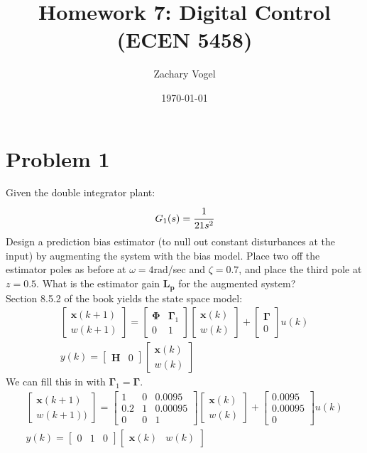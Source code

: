\documentclass{article}
\title{Homework 7: Digital Control (ECEN 5458)}
\author{Zachary Vogel}
\date{\today}
\begin{document}
\maketitle

\section*{Problem 1}
Given the double integrator plant:
\[G_1(s)=\cfrac{1}{21s^2}\]
Design a prediction bias estimator (to null out constant disturbances at the input) by augmenting the system with the bias model. Place two off the estimator poles as before at $\omega=4$rad/sec and $\zeta=0.7$, and place the third pole at $z=0.5$. What is the estimator gain $\pmb{L_p}$ for the augmented system?\\
Section 8.5.2 of the book yields the state space model:
\[\begin{split}\begin{bmatrix}\pmb{x}(k+1)\\w(k+1)\end{bmatrix}=\begin{bmatrix}\pmb{\Phi}&\pmb{\Gamma}_1\\0&1\end{bmatrix}\begin{bmatrix}\pmb{x}(k)\\w(k)\end{bmatrix}+\begin{bmatrix}\pmb{\Gamma}\\0\end{bmatrix}u(k)\\y(k)=\begin{bmatrix}\pmb{H}&0\end{bmatrix}\begin{bmatrix}\pmb{x}(k)\\w(k)\end{bmatrix}\end{split}\]
We can fill this in with $\pmb{\Gamma}_1=\pmb{\Gamma}$.
\[\begin{split}\begin{bmatrix}\pmb{x}(k+1)\\w(k+1))\end{bmatrix}=\begin{bmatrix}1&0&0.0095\\0.2&1&0.00095\\0&0&1\end{bmatrix}\begin{bmatrix}\pmb{x}(k)\\w(k)\end{bmatrix}+\begin{bmatrix}0.0095\\0.00095\\0\end{bmatrix}u(k)\\y(k)=\begin{bmatrix}0&1&0\end{bmatrix}\begin{bmatrix}\pmb{x}(k)&w(k)\end{bmatrix}\end{split}\]
\end{document}
